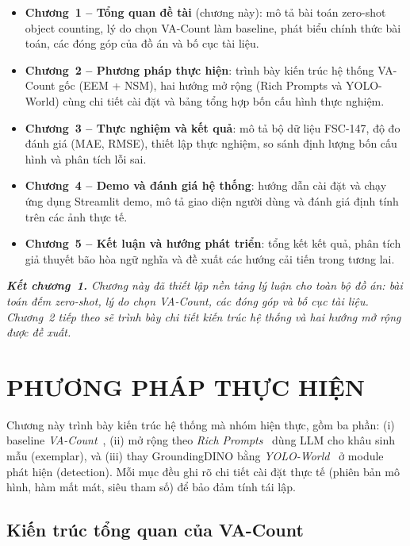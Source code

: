 \documentclass[a4paper,12pt]{report}
\numberwithin{figure}{chapter}
\numberwithin{table}{chapter}
\begin{document}
\begin{itemize}
    \item \textbf{Chương~1 -- Tổng quan đề tài} (chương này): mô tả bài toán zero-shot object counting, lý do chọn VA-Count làm baseline, phát biểu chính thức bài toán, các đóng góp của đồ án và bố cục tài liệu.
    \item \textbf{Chương~2 -- Phương pháp thực hiện}: trình bày kiến trúc hệ thống VA-Count gốc (EEM + NSM), hai hướng mở rộng (Rich Prompts và YOLO-World) cùng chi tiết cài đặt và bảng tổng hợp bốn cấu hình thực nghiệm.
    \item \textbf{Chương~3 -- Thực nghiệm và kết quả}: mô tả bộ dữ liệu FSC-147, độ đo đánh giá (MAE, RMSE), thiết lập thực nghiệm, so sánh định lượng bốn cấu hình và phân tích lỗi sai.
    \item \textbf{Chương~4 -- Demo và đánh giá hệ thống}: hướng dẫn cài đặt và chạy ứng dụng Streamlit demo, mô tả giao diện người dùng và đánh giá định tính trên các ảnh thực tế.
    \item \textbf{Chương~5 -- Kết luận và hướng phát triển}: tổng kết kết quả, phân tích giả thuyết bão hòa ngữ nghĩa và đề xuất các hướng cải tiến trong tương lai.
\end{itemize}

\bigskip
\noindent\textit{\textbf{Kết chương~1.} Chương này đã thiết lập nền tảng lý luận cho toàn bộ đồ án: bài toán đếm zero-shot, lý do chọn VA-Count, các đóng góp và bố cục tài liệu. Chương~2 tiếp theo sẽ trình bày chi tiết kiến trúc hệ thống và hai hướng mở rộng được đề xuất.}

\chapter{PHƯƠNG PHÁP THỰC HIỆN}
\label{ch:method}

Chương này trình bày kiến trúc hệ thống mà nhóm hiện thực, gồm ba phần: (i) baseline \textit{VA-Count}~\cite{vacount}, (ii) mở rộng theo \textit{Rich Prompts}~\cite{richprompts} dùng LLM cho khâu sinh mẫu (exemplar), và (iii) thay GroundingDINO bằng \textit{YOLO-World}~\cite{yoloworld} ở module phát hiện (detection). Mỗi mục đều ghi rõ chi tiết cài đặt thực tế (phiên bản mô hình, hàm mất mát, siêu tham số) để bảo đảm tính tái lập.

\section{Kiến trúc tổng quan của VA-Count}
\label{sec:vacount-overview}
\end{document}
